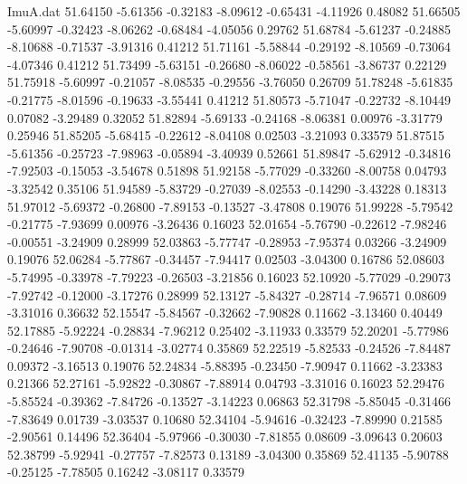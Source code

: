 \begin{filecontents}{ImuA.dat}
  51.64150   -5.61356   -0.32183   -8.09612   -0.65431   -4.11926    0.48082
  51.66505   -5.60997   -0.32423   -8.06262   -0.68484   -4.05056    0.29762
  51.68784   -5.61237   -0.24885   -8.10688   -0.71537   -3.91316    0.41212
  51.71161   -5.58844   -0.29192   -8.10569   -0.73064   -4.07346    0.41212
  51.73499   -5.63151   -0.26680   -8.06022   -0.58561   -3.86737    0.22129
  51.75918   -5.60997   -0.21057   -8.08535   -0.29556   -3.76050    0.26709
  51.78248   -5.61835   -0.21775   -8.01596   -0.19633   -3.55441    0.41212
  51.80573   -5.71047   -0.22732   -8.10449    0.07082   -3.29489    0.32052
  51.82894   -5.69133   -0.24168   -8.06381    0.00976   -3.31779    0.25946
  51.85205   -5.68415   -0.22612   -8.04108    0.02503   -3.21093    0.33579
  51.87515   -5.61356   -0.25723   -7.98963   -0.05894   -3.40939    0.52661
  51.89847   -5.62912   -0.34816   -7.92503   -0.15053   -3.54678    0.51898
  51.92158   -5.77029   -0.33260   -8.00758    0.04793   -3.32542    0.35106
  51.94589   -5.83729   -0.27039   -8.02553   -0.14290   -3.43228    0.18313
  51.97012   -5.69372   -0.26800   -7.89153   -0.13527   -3.47808    0.19076
  51.99228   -5.79542   -0.21775   -7.93699    0.00976   -3.26436    0.16023
  52.01654   -5.76790   -0.22612   -7.98246   -0.00551   -3.24909    0.28999
  52.03863   -5.77747   -0.28953   -7.95374    0.03266   -3.24909    0.19076
  52.06284   -5.77867   -0.34457   -7.94417    0.02503   -3.04300    0.16786
  52.08603   -5.74995   -0.33978   -7.79223   -0.26503   -3.21856    0.16023
  52.10920   -5.77029   -0.29073   -7.92742   -0.12000   -3.17276    0.28999
  52.13127   -5.84327   -0.28714   -7.96571    0.08609   -3.31016    0.36632
  52.15547   -5.84567   -0.32662   -7.90828    0.11662   -3.13460    0.40449
  52.17885   -5.92224   -0.28834   -7.96212    0.25402   -3.11933    0.33579
  52.20201   -5.77986   -0.24646   -7.90708   -0.01314   -3.02774    0.35869
  52.22519   -5.82533   -0.24526   -7.84487    0.09372   -3.16513    0.19076
  52.24834   -5.88395   -0.23450   -7.90947    0.11662   -3.23383    0.21366
  52.27161   -5.92822   -0.30867   -7.88914    0.04793   -3.31016    0.16023
  52.29476   -5.85524   -0.39362   -7.84726   -0.13527   -3.14223    0.06863
  52.31798   -5.85045   -0.31466   -7.83649    0.01739   -3.03537    0.10680
  52.34104   -5.94616   -0.32423   -7.89990    0.21585   -2.90561    0.14496
  52.36404   -5.97966   -0.30030   -7.81855    0.08609   -3.09643    0.20603
  52.38799   -5.92941   -0.27757   -7.82573    0.13189   -3.04300    0.35869
  52.41135   -5.90788   -0.25125   -7.78505    0.16242   -3.08117    0.33579

\end{filecontents}
